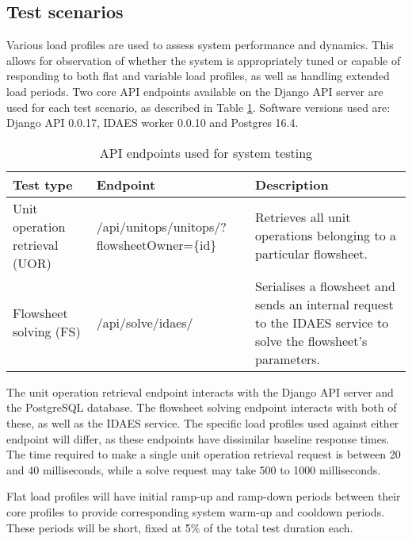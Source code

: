 
\subsection{Test scenarios}

Various load profiles are used to assess system performance and dynamics. This allows for observation of whether the system is appropriately tuned or capable of responding to both flat and variable load profiles, as well as handling extended load periods. Two core API endpoints available on the Django API server are used for each test scenario, as described in Table \ref{table:test-api-endpoints}. Software versions used are: Django API 0.0.17, IDAES worker 0.0.10 and Postgres 16.4.

\begin{table}[h]
    \centering
    \begin{tabularx}{\textwidth}{|p{}|X|p{}|}
        \hline
        \textbf{Test type} & \textbf{Endpoint} & \textbf{Description} \\ \hline
        Unit operation retrieval (UOR) & /api/unitops/unitops/?flowsheetOwner=\{id\} & Retrieves all unit operations belonging to a particular flowsheet. \\ \hline

        Flowsheet solving (FS) & /api/solve/idaes/ & Serialises a flowsheet and sends an internal request to the IDAES service to solve the flowsheet's parameters. \\ \hline
    \end{tabularx}
    \caption{API endpoints used for system testing}
    \label{table:test-api-endpoints}
\end{table}

The unit operation retrieval endpoint interacts with the Django API server and the PostgreSQL database. The flowsheet solving endpoint interacts with both of these, as well as the IDAES service. The specific load profiles used against either endpoint will differ, as these endpoints have dissimilar baseline response times. The time required to make a single unit operation retrieval request is between 20 and 40 milliseconds, while a solve request may take 500 to 1000 milliseconds.


Flat load profiles will have initial ramp-up and ramp-down periods between their core profiles to provide corresponding system warm-up and cooldown periods. These periods will be short, fixed at 5\% of the total test duration each.

